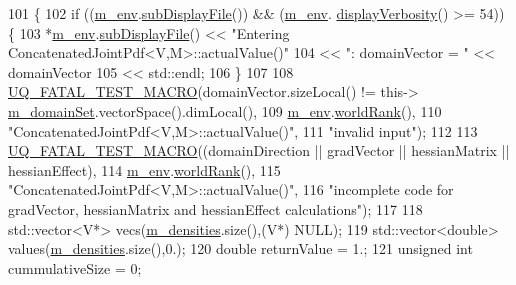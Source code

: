 \begin{DoxyCode}
101 \{
102   \textcolor{keywordflow}{if} ((\hyperlink{class_q_u_e_s_o_1_1_base_scalar_function_adf44141aeb765d97613286f88f235f04}{m\_env}.\hyperlink{class_q_u_e_s_o_1_1_base_environment_a8a0064746ae8dddfece4229b9ad374d6}{subDisplayFile}()) && (\hyperlink{class_q_u_e_s_o_1_1_base_scalar_function_adf44141aeb765d97613286f88f235f04}{m\_env}.
      \hyperlink{class_q_u_e_s_o_1_1_base_environment_a1fe5f244fc0316a0ab3e37463f108b96}{displayVerbosity}() >= 54)) \{
103     *\hyperlink{class_q_u_e_s_o_1_1_base_scalar_function_adf44141aeb765d97613286f88f235f04}{m\_env}.\hyperlink{class_q_u_e_s_o_1_1_base_environment_a8a0064746ae8dddfece4229b9ad374d6}{subDisplayFile}() << \textcolor{stringliteral}{"Entering ConcatenatedJointPdf<V,M>::actualValue()"}
104                             << \textcolor{stringliteral}{": domainVector = "} << domainVector
105                             << std::endl;
106   \}
107 
108   \hyperlink{_defines_8h_a56d63d18d0a6d45757de47fcc06f574d}{UQ\_FATAL\_TEST\_MACRO}(domainVector.sizeLocal() != this->
      \hyperlink{class_q_u_e_s_o_1_1_base_scalar_function_a67696e86211197938c72cd11863f5cf8}{m\_domainSet}.vectorSpace().dimLocal(),
109                       \hyperlink{class_q_u_e_s_o_1_1_base_scalar_function_adf44141aeb765d97613286f88f235f04}{m\_env}.\hyperlink{class_q_u_e_s_o_1_1_base_environment_a78b57112bbd0e6dd0e8afec00b40ffa7}{worldRank}(),
110                       \textcolor{stringliteral}{"ConcatenatedJointPdf<V,M>::actualValue()"},
111                       \textcolor{stringliteral}{"invalid input"});
112 
113   \hyperlink{_defines_8h_a56d63d18d0a6d45757de47fcc06f574d}{UQ\_FATAL\_TEST\_MACRO}((domainDirection || gradVector || hessianMatrix || hessianEffect),
114                       \hyperlink{class_q_u_e_s_o_1_1_base_scalar_function_adf44141aeb765d97613286f88f235f04}{m\_env}.\hyperlink{class_q_u_e_s_o_1_1_base_environment_a78b57112bbd0e6dd0e8afec00b40ffa7}{worldRank}(),
115                       \textcolor{stringliteral}{"ConcatenatedJointPdf<V,M>::actualValue()"},
116                       \textcolor{stringliteral}{"incomplete code for gradVector, hessianMatrix and hessianEffect calculations"});
117 
118   std::vector<V*> vecs(\hyperlink{class_q_u_e_s_o_1_1_concatenated_joint_pdf_a42ee130daadf7ceb0d1745011f5b1169}{m\_densities}.size(),(V*) NULL);
119   std::vector<double> values(\hyperlink{class_q_u_e_s_o_1_1_concatenated_joint_pdf_a42ee130daadf7ceb0d1745011f5b1169}{m\_densities}.size(),0.);
120   \textcolor{keywordtype}{double} returnValue = 1.;
121   \textcolor{keywordtype}{unsigned} \textcolor{keywordtype}{int} cummulativeSize = 0;

\end{DoxyCode}
